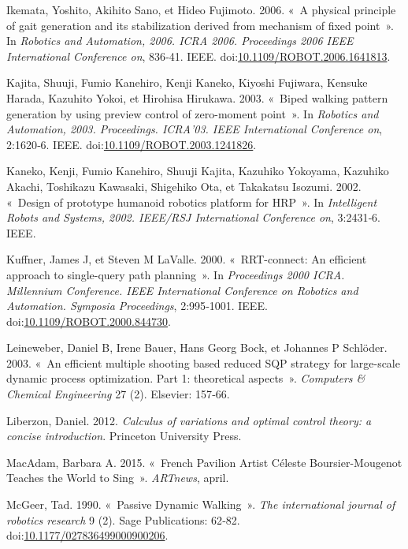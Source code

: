 \documentclass[french,A4paper,]{book}
\begin{document}
\hypertarget{ref-ikemata06}{}
Ikemata, Yoshito, Akihito Sano, et Hideo Fujimoto. 2006. «~A physical
principle of gait generation and its stabilization derived from
mechanism of fixed point~». In \emph{Robotics and Automation, 2006. ICRA
2006. Proceedings 2006 IEEE International Conference on}, 836‑41. IEEE.
doi:\href{https://doi.org/10.1109/ROBOT.2006.1641813}{10.1109/ROBOT.2006.1641813}.

\hypertarget{ref-kajita03}{}
Kajita, Shuuji, Fumio Kanehiro, Kenji Kaneko, Kiyoshi Fujiwara, Kensuke
Harada, Kazuhito Yokoi, et Hirohisa Hirukawa. 2003. «~Biped walking
pattern generation by using preview control of zero-moment point~». In
\emph{Robotics and Automation, 2003. Proceedings. ICRA'03. IEEE
International Conference on}, 2:1620‑6. IEEE.
doi:\href{https://doi.org/10.1109/ROBOT.2003.1241826}{10.1109/ROBOT.2003.1241826}.

\hypertarget{ref-kaneko02}{}
Kaneko, Kenji, Fumio Kanehiro, Shuuji Kajita, Kazuhiko Yokoyama,
Kazuhiko Akachi, Toshikazu Kawasaki, Shigehiko Ota, et Takakatsu
Isozumi. 2002. «~Design of prototype humanoid robotics platform for
HRP~». In \emph{Intelligent Robots and Systems, 2002. IEEE/RSJ
International Conference on}, 3:2431‑6. IEEE.

\hypertarget{ref-rrt}{}
Kuffner, James J, et Steven M LaValle. 2000. «~RRT-connect: An efficient
approach to single-query path planning~». In \emph{Proceedings 2000
ICRA. Millennium Conference. IEEE International Conference on Robotics
and Automation. Symposia Proceedings}, 2:995‑1001. IEEE.
doi:\href{https://doi.org/10.1109/ROBOT.2000.844730}{10.1109/ROBOT.2000.844730}.

\hypertarget{ref-leineweber03}{}
Leineweber, Daniel B, Irene Bauer, Hans Georg Bock, et Johannes P
Schlöder. 2003. «~An efficient multiple shooting based reduced SQP
strategy for large-scale dynamic process optimization. Part 1:
theoretical aspects~». \emph{Computers \& Chemical Engineering} 27 (2).
Elsevier: 157‑66.

\hypertarget{ref-liberzon12}{}
Liberzon, Daniel. 2012. \emph{Calculus of variations and optimal control
theory: a concise introduction}. Princeton University Press.

\hypertarget{ref-MacAdam}{}
MacAdam, Barbara A. 2015. «~French Pavilion Artist Céleste
Boursier-Mougenot Teaches the World to Sing~». \emph{ARTnews}, april.

\hypertarget{ref-mcgeer90}{}
McGeer, Tad. 1990. «~Passive Dynamic Walking~». \emph{The international
journal of robotics research} 9 (2). Sage Publications: 62‑82.
doi:\href{https://doi.org/10.1177/027836499000900206}{10.1177/027836499000900206}.
\end{document}
